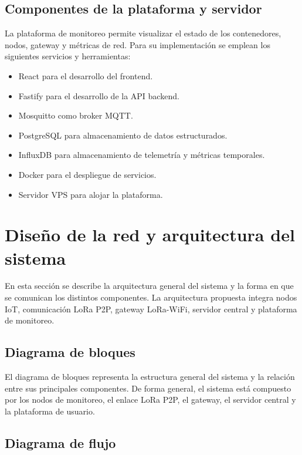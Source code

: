 \endgroup

\subsection{Componentes de la plataforma y servidor}

La plataforma de monitoreo permite visualizar el estado de los contenedores, nodos, gateway y métricas de red. Para su implementación se emplean los siguientes servicios y herramientas:

\begin{itemize}
    \item React para el desarrollo del frontend.
    \item Fastify para el desarrollo de la API backend.
    \item Mosquitto como broker MQTT.
    \item PostgreSQL para almacenamiento de datos estructurados.
    \item InfluxDB para almacenamiento de telemetría y métricas temporales.
    \item Docker para el despliegue de servicios.
    \item Servidor VPS para alojar la plataforma.
\end{itemize}

\section{Diseño de la red y arquitectura del sistema}

En esta sección se describe la arquitectura general del sistema y la forma en que se comunican los distintos componentes. La arquitectura propuesta integra nodos IoT, comunicación LoRa P2P, gateway LoRa-WiFi, servidor central y plataforma de monitoreo.

\subsection{Diagrama de bloques}

El diagrama de bloques representa la estructura general del sistema y la relación entre sus principales componentes. De forma general, el sistema está compuesto por los nodos de monitoreo, el enlace LoRa P2P, el gateway, el servidor central y la plataforma de usuario.

\subsection{Diagrama de flujo}

